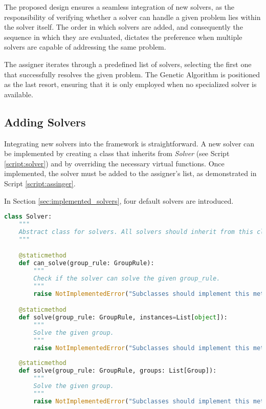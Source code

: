             The proposed design ensures a seamless integration of new solvers, as the responsibility of verifying whether a solver can handle a given problem lies within the solver itself. The order in which solvers are added, and consequently the sequence in which they are evaluated, dictates the preference when multiple solvers are capable of addressing the same problem.

            The assigner iterates through a predefined list of solvers, selecting the first one that successfully resolves the given problem. The Genetic Algorithm is positioned as the last resort, ensuring that it is only employed when no specialized solver is available.

        \subsection{Adding Solvers}
            Integrating new solvers into the framework is straightforward.
            A new solver can be implemented by creating a class that inherits from \textit{Solver} (see Script \ref{script:solver}) and by overriding the necessary virtual functions.
            Once implemented, the solver must be added to the assigner's list, as demonstrated in Script \ref{script:assinger}.

            In Section \ref{sec:implemented_solvers}, four default solvers are introduced.

\begin{lstlisting}[language=Python, caption={Solver Class.}, label={script:solver}]
class Solver:
    """
    Abstract class for solvers. All solvers should inherit from this class.
    """

    @staticmethod
    def can_solve(group_rule: GroupRule):
        """
        Check if the solver can solve the given group_rule.
        """
        raise NotImplementedError("Subclasses should implement this method.")

    @staticmethod
    def solve(group_rule: GroupRule, instances=List[object]):
        """
        Solve the given group.
        """
        raise NotImplementedError("Subclasses should implement this method.")
    
    @staticmethod
    def solve(group_rule: GroupRule, groups: List[Group]):
        """
        Solve the given group.
        """
        raise NotImplementedError("Subclasses should implement this method.")
    \end{lstlisting}

